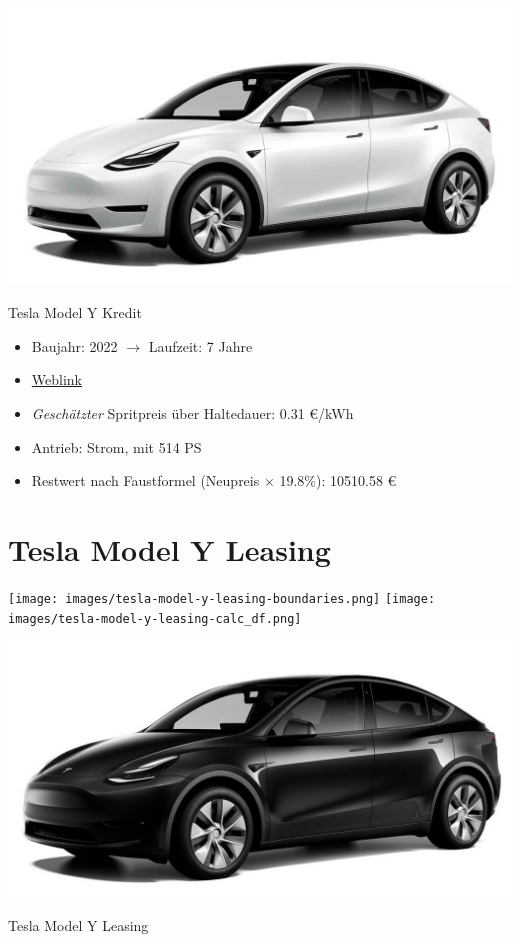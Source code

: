 \documentclass[landscape, DIV=99, 14pt]{scrartcl}
\begin{document}
\pagebreak
\null
\vspace{2cm}
\begin{center}
\includegraphics[width=0.9\columnwidth]{cars/tesla-model-y.jpg}

Tesla Model Y Kredit
\end{center}

\begin{itemize}
    \item Baujahr: 2022 $\rightarrow$ Laufzeit: 7 Jahre
    \item \href{https://www.tesla.com/de_de/modely/design\#overview}{Weblink}
    \item \emph{Gesch\"atzter} Spritpreis \"uber Haltedauer: 0.31 \euro{}/kWh
    \item Antrieb: Strom, mit 514 PS
    \item Restwert nach Faustformel (Neupreis $\times$ 19.8\%): 10510.58 \euro{}
\end{itemize}

\pagebreak


\twocolumn

\section*{Tesla Model Y Leasing}
\begin{center}
\texttt{[image: images/tesla-model-y-leasing-boundaries.png]}
\null
\vspace{0.5cm}
\texttt{[image: images/tesla-model-y-leasing-calc\_df.png]}
\end{center}

\pagebreak
\null
\vspace{2cm}
\begin{center}
\includegraphics[width=0.9\columnwidth]{cars/tesla-model-y-leasing.jpg}

Tesla Model Y Leasing
\end{center}
\end{document}

